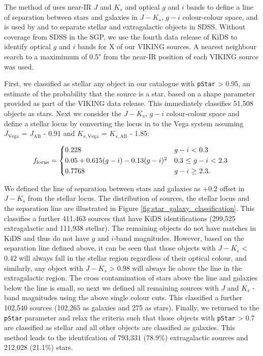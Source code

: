 The method of \citealt{Baldry_2010} uses near-IR $J$ and $K_s$ and optical $g$ and $i$ bands to define a line of separation between stars and galaxies in $J - K_s$, $g - i$ colour-colour space, and is used by \citealt{Bourne_2016} and \citealt{Furlanetto_2018} to separate stellar and extragalactic objects in SDSS. Without coverage from SDSS in the SGP, we use the fourth data release of KiDS to identify optical $g$ and $i$ bands for {\color{red} X} of our VIKING sources. A nearest neighbour search to a maximimum of 0.5" from the near-IR position of each VIKING source was used.

First, we classified as stellar any object in our catalogue with \texttt{pStar} > 0.95, an estimate of the probability that the source is a star, based on a shape parameter provided as part of the VIKING data release. This immediately classifies 51,508 objects as stars. Next we consider the $J - K_s$, $g - i$ colour-colour space and define a stellar locus by converting the locus in \citealt{Baldry_2010} to the Vega system assuming $J_{\textrm{Vega}}$ = $J_{\textrm{AB}}$ - 0.91 and $K_{s,\textrm{Vega}}$ = $K_{s,\textrm{AB}}$ - 1.85:

\begin{equation}
    f_{\textrm{locus}} = 
    \begin{cases*}
        0.228 & $g-i$ < 0.3 \\
        0.05 + 0.615(g-i) - 0.13(g-i)^2 & 0.3 $\leq$ $g-i$ < 2.3 \\
        0.7768 & $g-i$ $\geq$ 2.3.
    \end{cases*}
\label{eq:stellar_locus}
\end{equation}

We defined the line of separation between stars and galaxies as +0.2 offset in $J - K_s$ from the stellar locus. The distribution of sources, the stellar locus and the separation line are illustrated in Figure \ref{fig:star_galaxy_classification}. This classifies a further 411,463 sources that have KiDS identifications (299,525 extragalactic and 111,938 stellar). The remaining objects do not have matches in KiDS and thus do not have $g$ and $i$-band magnitudes. However, based on the separation line defined above, it can be seen that those objects with $J - K_s$ < 0.42 will always fall in the stellar region regardless of their optical colour, and similarly, any object with  $J - K_s$ > 0.98 will always lie above the line in the extragalactic region. The cross contamination of stars above the line and galaxies below the line is small, so next we defined all remaining sources with $J$ and $K_s$ -band magnitudes using the above single colour cuts. This classified a further 102,540 sources (102,265 as galaxies and 275 as stars). Finally, we returned to the \texttt{pStar} parameter and relax the criteria such that those objects with \texttt{pStar} > 0.7 are classified as stellar and all other objects are classified as galaxies. This method leads to the identifcation of 793,331 (78.9\%) extragalactic sources and 212,028 (21.1\%) stars.

